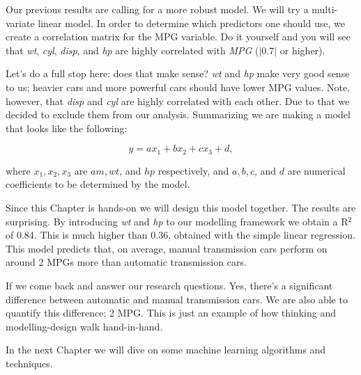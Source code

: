 Our previous results are calling for a more robust model. We will try a multi-variate linear model. In order to determine which predictors one should use, we create a correlation matrix for the MPG variable. Do it yourself and you will see that \textit{wt}, \textit{cyl}, \textit{disp}, and \textit{hp} are highly correlated with \textit{MPG} ($\left|0.7\right|$ or higher).

Let's do a full stop here: does that make sense? \textit{wt} and \textit{hp} make very good sense to us; heavier cars and more powerful cars should have lower MPG values. Note, however, that \textit{disp} and \textit{cyl} are highly correlated with each other. Due to that we decided to exclude them from our analysis. Summarizing we are making a model that looks like the following:

\begin{equation}
y = ax_1 + bx_2 + cx_3 + d,
\end{equation}

where $x_1,x_2,x_3$ are $am,wt$, and $hp$ respectively, and $a,b,c$, and $d$ are numerical coefficients to be determined by the model.

Since this Chapter is hands-on we will design this model together. The results are surprising. By introducing \textit{wt} and \textit{hp} to our modelling framework we obtain a R$^2$ of 0.84. This is much higher than $0.36$, obtained with the simple linear regression. This model predicts that, on average, manual transmission cars perform on around 2 MPGs more than automatic transmission cars.

If we come back and answer our research questions. Yes, there's a significant difference between automatic and manual transmission cars. We are also able to quantify this difference: 2 MPG. This is just an example of how thinking and modelling-design walk hand-in-hand. 

In the next Chapter we will dive on some machine learning algorithms and techniques.



